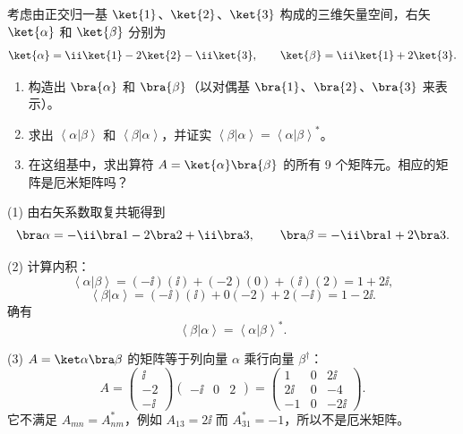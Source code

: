\begin{question}
考虑由正交归一基 $\ket{1}$、$\ket{2}$、$\ket{3}$ 构成的三维矢量空间，右矢 $\ket{\alpha}$ 和 $\ket{\beta}$ 分别为
\[
\ket{\alpha}=\ii\ket{1}-2\ket{2}-\ii\ket{3},
\qquad
\ket{\beta}=\ii\ket{1}+2\ket{3}.
\]
\begin{enumerate}
\item 构造出 $\bra{\alpha}$ 和 $\bra{\beta}$（以对偶基 $\bra{1}$、$\bra{2}$、$\bra{3}$ 来表示）。
\item 求出 $\left\langle \alpha|\beta \right\rangle$ 和 $\left\langle \beta|\alpha \right\rangle$，并证实 $\left\langle \beta|\alpha \right\rangle=\left\langle \alpha|\beta \right\rangle^*$。
\item 在这组基中，求出算符 $A=\ket{\alpha}\bra{\beta}$ 的所有 9 个矩阵元。相应的矩阵是厄米矩阵吗？
\end{enumerate}
\end{question}
\begin{solution}
(1) 由右矢系数取复共轭得到
\[
\bra\alpha=-\ii\bra1-2\bra2+\ii\bra3,
\qquad
\bra\beta=-\ii\bra1+2\bra3.
\]

(2) 计算内积：
\[
\left\langle \alpha|\beta \right\rangle=(-\ii)(\ii)+(-2)(0)+(\ii)(2)=1+2\ii,
\]
\[
\left\langle \beta|\alpha \right\rangle=(-\ii)(\ii)+0(-2)+2(-\ii)=1-2\ii.
\]
确有
\[
\left\langle \beta|\alpha \right\rangle=\left\langle \alpha|\beta \right\rangle^*.
\]

(3) $A=\ket\alpha\bra\beta$ 的矩阵等于列向量 $\alpha$ 乘行向量 $\beta^\dagger$：
\[
A=\begin{pmatrix}\ii\\-2\\-\ii\end{pmatrix}
\begin{pmatrix}-\ii&0&2\end{pmatrix}
=\begin{pmatrix}
1&0&2\ii\\
2\ii&0&-4\\
-1&0&-2\ii
\end{pmatrix}.
\]
它不满足 $A_{mn}=A_{nm}^*$，例如 $A_{13}=2\ii$ 而 $A_{31}^*=-1$，所以不是厄米矩阵。
\end{solution}

